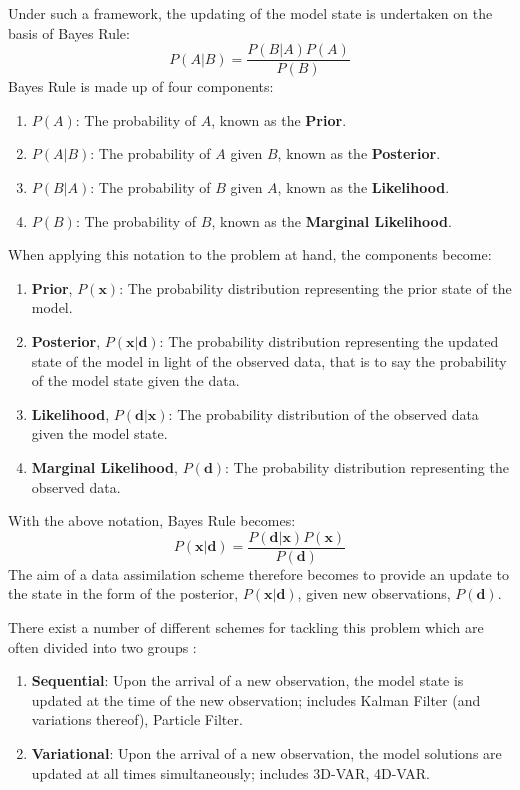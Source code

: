 Under such a framework, the updating of the model state is undertaken on the
basis of Bayes Rule:
\begin{equation}
    P(A|B) = \frac{P(B|A) P(A)}{P(B)}
\end{equation}
Bayes Rule is made up of four components:
\begin{enumerate}
    \item $P \left( A \right)$: The probability of $A$, known as the
        \textbf{Prior}.
    \item $P \left( A|B \right)$: The probability of $A$ given $B$, known as the
        \textbf{Posterior}.
    \item $P \left( B|A \right)$: The probability of $B$ given $A$, known as the
        \textbf{Likelihood}.
    \item $P \left( B \right)$: The probability of $B$, known as the
        \textbf{Marginal Likelihood}.
\end{enumerate}
When applying this notation to the problem at hand, the components become:
\begin{enumerate}
    \item \textbf{Prior}, $P(\mathbf{x})$: The probability distribution
        representing the prior state of the model.
    \item \textbf{Posterior}, $P(\mathbf{x}|\mathbf{d})$: The probability
        distribution representing the updated state of the model in light of the
        observed data, that is to say the probability of the model state given
        the data.
    \item \textbf{Likelihood}, $P(\mathbf{d}|\mathbf{x})$: The probability
        distribution of the observed data given the model state.
    \item \textbf{Marginal Likelihood}, $P(\mathbf{d})$: The probability
        distribution representing the observed data.
\end{enumerate}
With the above notation, Bayes Rule becomes:
\begin{equation}
    P \left( \mathbf{x} | \mathbf{d} \right) =
       \frac{P \left( \mathbf{d} | \mathbf{x} \right)
             P \left( \mathbf{x} \right)}{P \left( \mathbf{d} \right)} 
\end{equation}
The aim of a data assimilation scheme therefore becomes to provide an update to
the  state in the form of the posterior, $P \left( \mathbf{x} | \mathbf{d}
\right)$, given new observations, $P \left( \mathbf{d} \right)$.

There exist a number of different schemes for tackling this problem which are
often divided into two groups \citep{talagrand1997assimilation}:
\begin{enumerate}
    \item \textbf{Sequential}: Upon the arrival of a new observation, the model
        state is updated at the time of the new observation; includes Kalman
        Filter (and variations thereof), Particle Filter.
    \item \textbf{Variational}: Upon the arrival of a new observation, the model
        solutions are updated at all times simultaneously; includes 3D-VAR,
        4D-VAR.
\end{enumerate}

